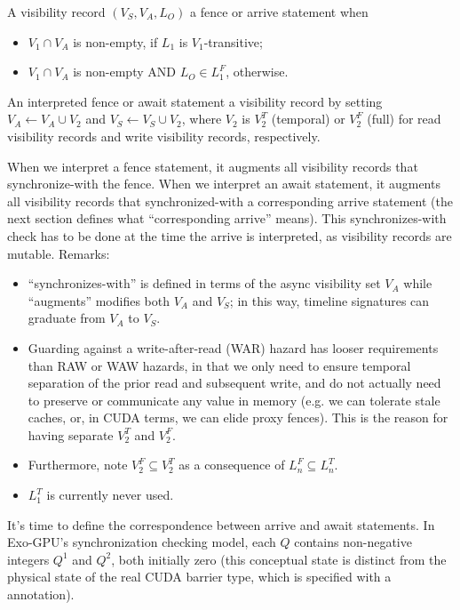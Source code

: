 \filbreak
A visibility record $(V_S, V_A, L_O)$  a fence or arrive statement when
\begin{itemize}
  \item $V_1 \cap V_A$ is non-empty, if $L_1$ is $V_1$-transitive;
  \filbreak
  \item $V_1 \cap V_A$ is non-empty AND $L_O \in L_1^F$, otherwise.
\end{itemize}
\filbreak

\filbreak
An interpreted fence or await statement  a visibility record by setting $V_A \leftarrow V_A \cup V_2$ and $V_S \leftarrow V_S \cup V_2$, where $V_2$ is $V_2^T$ (temporal) or $V_2^F$ (full) for read visibility records and write visibility records, respectively.

\filbreak
When we interpret a fence statement, it augments all visibility records that synchronize-with the fence.
When we interpret an await statement, it augments all visibility records that synchronized-with a corresponding arrive statement
(the next section defines what ``corresponding arrive'' means).
This synchronizes-with check has to be done at the time the arrive is interpreted, as visibility records are mutable.
Remarks:
\filbreak
\begin{itemize}
  \item ``synchronizes-with'' is defined in terms of the async visibility set $V_A$ while ``augments'' modifies both $V_A$ and $V_S$; in this way, timeline signatures can graduate from $V_A$ to $V_S$.
  \filbreak
  \item Guarding against a write-after-read (WAR) hazard has looser requirements than RAW or WAW hazards, in that we only need to ensure temporal separation of the prior read and subsequent write, and do not actually need to preserve or communicate any value in memory (e.g. we can tolerate stale caches, or, in CUDA terms, we can elide proxy fences).
  This is the reason for having separate $V_2^T$ and $V_2^F$.
  \filbreak
  \item Furthermore, note $V_2^F \subseteq V_2^T$ as a consequence of $L_n^F \subseteq L_n^T$.
  \filbreak
  \item $L_1^T$ is currently never used.
\end{itemize}

\newpage
{}
\label{ch:ArriveAwaitPairing}

It's time to define the correspondence between arrive and await statements.
In Exo-GPU's synchronization checking model, each  $Q$ contains non-negative integers  $Q^1$ and  $Q^2$, both initially zero (this conceptual state is distinct from the physical state of the real CUDA barrier type, which is specified with a  annotation).

